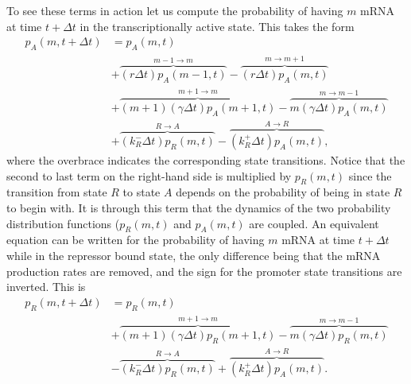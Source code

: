 To see these terms in action let us compute the probability of having $m$ mRNA
at time $t + \Delta t$ in the transcriptionally active state. This takes the 
form
\begin{equation}
\begin{aligned}
p_A(m, t + \Delta t) &= p_A(m, t) \\
&+ \overbrace{(r\Delta t) p_A(m-1, t)}^{m-1 \rightarrow m}
- \overbrace{(r\Delta t) p_A(m, t)}^{m \rightarrow m+1}\\
&+ \overbrace{(m+1)(\gamma \Delta t) p_A(m+1, t)}^{m+1 \rightarrow m}
- \overbrace{m(\gamma \Delta t) p_A(m, t)}^{m \rightarrow m-1}\\
&+\overbrace{(k_R^- \Delta t) p_R(m, t)}^{R \rightarrow A}
-\overbrace{(k_R^+ \Delta t) p_A(m, t)}^{A \rightarrow R},
\end{aligned}
\end{equation}
where the overbrace indicates the corresponding state transitions. Notice that
the second to last term on the right-hand side is multiplied by $p_R(m, t)$ 
since the transition from state $R$ to state $A$ depends on the probability of
being in state $R$ to begin with. It is through this term that the dynamics of the two probability
distribution functions ($p_R(m,t)$ and $p_A(m,t)$ are coupled. An equivalent equation can be written for
the probability of having $m$ mRNA at time $t + \Delta t$ while in the repressor
bound state, the only difference being that the mRNA production rates are 
removed, and the sign for the promoter state transitions are inverted. This is
\begin{equation}
\begin{aligned}
p_R(m, t + \Delta t) &= p_R(m, t) \\
&+ \overbrace{(m+1)(\gamma \Delta t) p_R(m+1, t)}^{m+1 \rightarrow m}
- \overbrace{m(\gamma \Delta t) p_R(m, t)}^{m \rightarrow m-1}\\
&-\overbrace{(k_R^- \Delta t) p_R(m, t)}^{R \rightarrow A}
+\overbrace{(k_R^+ \Delta t) p_A(m, t)}^{A \rightarrow R}.
\end{aligned}
\end{equation}

